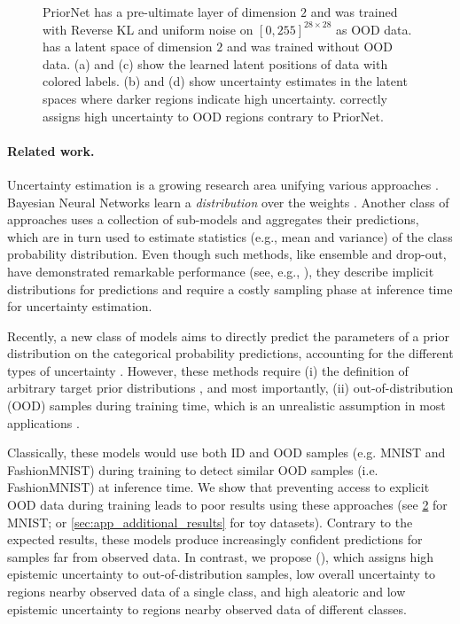 \begin{figure}[ht!]
\begin{subfigure}[t]{0.23\columnwidth}
        \label{ours_visualization_unc}
    \end{subfigure}%
    \caption{PriorNet has a pre-ultimate layer of dimension $2$ and was trained with Reverse KL and uniform noise on $[0,255]^{28\times28}$ as OOD data. \PostNetacro has a latent space of dimension $2$ and was trained without OOD data. (a) and (c) show the learned latent positions of data with colored labels. (b) and (d) show uncertainty estimates in the latent spaces where darker regions indicate high uncertainty. \PostNetacro correctly assigns high uncertainty to OOD regions contrary to PriorNet.}
    \label{fig:mnist_2D_latent_space}
\end{figure}

\paragraph{Related work.} Uncertainty estimation is a growing research area unifying various approaches \cite{bayesian-networks, simple-baseline-uncertainty, practical_deep_bayesian_principles, Eswaran2017, ensembles, dropout}. Bayesian Neural Networks learn a \emph{distribution} over the weights \cite{bayesian-networks, simple-baseline-uncertainty, practical_deep_bayesian_principles}. Another class of approaches uses a collection of sub-models and aggregates their predictions, which are in turn used to estimate statistics (e.g., mean and variance) of the class probability distribution. Even though such methods, like ensemble and drop-out, have demonstrated remarkable performance (see, e.g., \cite{dataset-shift}), they describe implicit distributions for predictions and require a costly sampling phase at inference time for uncertainty estimation. 

Recently, a new class of models aims to directly predict the parameters of a prior distribution on the categorical probability predictions, accounting for the different types of uncertainty \cite{PriorNetworks, reverse-kl, sensoy2018, uceloss}. However, these methods require (i) the definition of arbitrary target prior distributions \cite{PriorNetworks, reverse-kl, sensoy2018}, and most importantly, (ii) out-of-distribution (OOD) samples during training time, which is an unrealistic assumption in most applications \cite{PriorNetworks, reverse-kl}.

Classically, these models would use both ID and OOD samples (e.g. MNIST and FashionMNIST) during training to detect similar OOD samples (i.e. FashionMNIST) at inference time. We show that preventing access to explicit OOD data during training leads to poor results using these approaches (see \cref{fig:mnist_2D_latent_space} for MNIST; or \cref{sec:app_additional_results} for toy datasets). Contrary to the expected results, these models produce increasingly confident predictions for samples far from observed data. In contrast, we propose \PostNet (\PostNetacro), which assigns high epistemic uncertainty to out-of-distribution samples, low overall uncertainty to regions nearby observed data of a single class, and high aleatoric and low epistemic uncertainty to regions nearby observed data of different classes.

